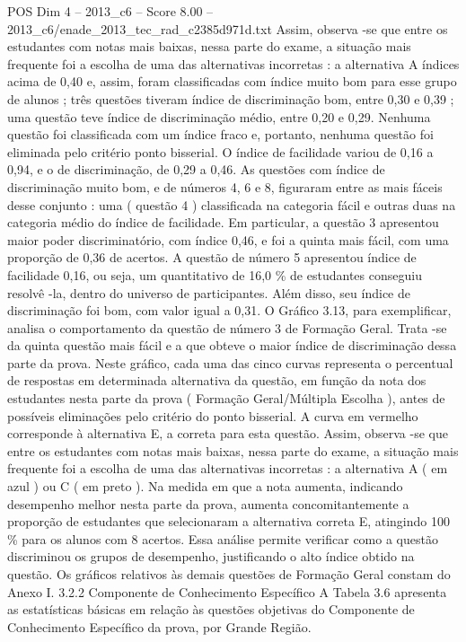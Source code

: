 \begin{textsample}{POS Dim 4 – 2013\_c6 – Score 8.00 – 2013\_c6/enade\_2013\_tec\_rad\_c2385d971d.txt}
Assim, observa -se que entre os estudantes com notas mais baixas, nessa parte do exame, a situação mais frequente foi a escolha de uma das alternativas incorretas : a alternativa A índices acima de 0,40 e, assim, foram classificadas com índice muito bom para esse grupo de alunos ; três questões tiveram índice de discriminação bom, entre 0,30 e 0,39 ; uma questão teve índice de discriminação médio, entre 0,20 e 0,29.
Nenhuma questão foi classificada com um índice fraco e, portanto, nenhuma questão foi eliminada pelo critério ponto bisserial.
O índice de facilidade variou de 0,16 a 0,94, e o de discriminação, de 0,29 a 0,46.
As questões com índice de discriminação muito bom, e de números 4, 6 e 8, figuraram entre as mais fáceis desse conjunto : uma ( questão 4 ) classificada na categoria fácil e outras duas na categoria médio do índice de facilidade.
Em particular, a questão 3 apresentou maior poder discriminatório, com índice 0,46, e foi a quinta mais fácil, com uma proporção de 0,36 de acertos.
A questão de número 5 apresentou índice de facilidade 0,16, ou seja, um quantitativo de 16,0 \% de estudantes conseguiu resolvê -la, dentro do universo de participantes.
Além disso, seu índice de discriminação foi bom, com valor igual a 0,31.
O Gráfico 3.13, para exemplificar, analisa o comportamento da questão de número 3 de Formação Geral.
Trata -se da quinta questão mais fácil e a que obteve o maior índice de discriminação dessa parte da prova.
Neste gráfico, cada uma das cinco curvas representa o percentual de respostas em determinada alternativa da questão, em função da nota dos estudantes nesta parte da prova ( Formação Geral/Múltipla Escolha ), antes de possíveis eliminações pelo critério do ponto bisserial.
A curva em vermelho corresponde à alternativa E, a correta para esta questão.
Assim, observa -se que entre os estudantes com notas mais baixas, nessa parte do exame, a situação mais frequente foi a escolha de uma das alternativas incorretas : a alternativa A ( em azul ) ou C ( em preto ).
Na medida em que a nota aumenta, indicando desempenho melhor nesta parte da prova, aumenta concomitantemente a proporção de estudantes que selecionaram a alternativa correta E, atingindo 100 \% para os alunos com 8 acertos.
Essa análise permite verificar como a questão discriminou os grupos de desempenho, justificando o alto índice obtido na questão.
Os gráficos relativos às demais questões de Formação Geral constam do Anexo I. 3.2.2 Componente de Conhecimento Específico A Tabela 3.6 apresenta as estatísticas básicas em relação às questões objetivas do Componente de Conhecimento Específico da prova, por Grande Região.

\end{textsample}
